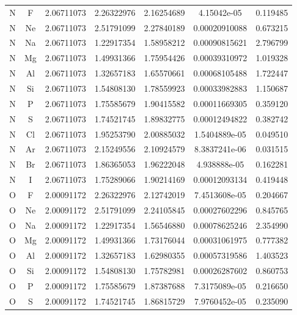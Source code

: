 \begin{longtable}{@{}ccccccc@{}}
N  &  F     &     2.06711073   &   2.26322976  &    2.16254689 &    4.15042e-05  &  0.119485\\
N  &  Ne    &     2.06711073   &   2.51791099  &    2.27840189 &  0.00020910088  &  0.673215\\
N  &  Na    &     2.06711073   &   1.22917354  &    1.58958212 &  0.00090815621  &  2.796799\\
N  &  Mg    &     2.06711073   &   1.49931366  &    1.75954426 &  0.00039310972  &  1.019328\\
N  &  Al    &     2.06711073   &   1.32657183  &    1.65570661 &  0.00068105488  &  1.722447\\
N  &  Si    &     2.06711073   &   1.54808130  &    1.78559923 &  0.00033982883  &  1.150687\\
N  &  P     &     2.06711073   &   1.75585679  &    1.90415582 &  0.00011669305  &  0.359120\\
N  &  S     &     2.06711073   &   1.74521745  &    1.89832775 &  0.00012494822  &  0.382742\\
N  &  Cl    &     2.06711073   &   1.95253790  &    2.00885032 &  1.5404889e-05  &  0.049510\\
N  &  Ar    &     2.06711073   &   2.15249556  &    2.10924579 &  8.3837241e-06  &  0.031515\\
N  &  Br    &     2.06711073   &   1.86365053  &    1.96222048 &   4.938888e-05  &  0.162281\\
N  &  I     &     2.06711073   &   1.75289066  &    1.90214169 &  0.00012093134  &  0.419448\\
O  &  F     &     2.00091172   &   2.26322976  &    2.12742019 &  7.4513608e-05  &  0.204667\\
O  &  Ne    &     2.00091172   &   2.51791099  &    2.24105845 &  0.00027602296  &  0.845765\\
O  &  Na    &     2.00091172   &   1.22917354  &    1.56546880 &  0.00078625246  &  2.354990\\
O  &  Mg    &     2.00091172   &   1.49931366  &    1.73176044 &  0.00031061975  &  0.777382\\
O  &  Al    &     2.00091172   &   1.32657183  &    1.62980355 &  0.00057319586  &  1.403523\\
O  &  Si    &     2.00091172   &   1.54808130  &    1.75782981 &  0.00026287602  &  0.860753\\
O  &  P     &     2.00091172   &   1.75585679  &    1.87387688 &  7.3175089e-05  &  0.216650\\
O  &  S     &     2.00091172   &   1.74521745  &    1.86815729 &  7.9760452e-05  &  0.235090\\

\end{longtable}
